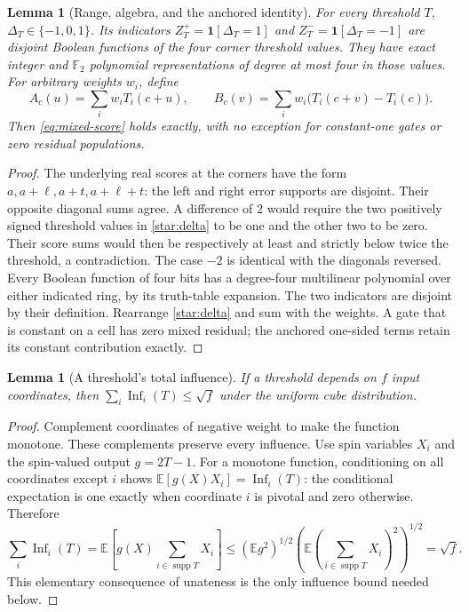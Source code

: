 \documentclass[11pt,letterpaper]{article}
\newtheorem{lemma}[theorem]{Lemma}
\theoremstyle{definition}
\theoremstyle{remark}
\newcommand{\E}{\mathbb E}
\newcommand{\F}{\mathbb F}
\newcommand{\ind}{\mathbf 1}
\newcommand{\supp}{\operatorname{supp}}
\newcommand{\Inf}{\operatorname{Inf}}
\begin{document}
\begin{lemma}[Range, algebra, and the anchored identity]
\label{star:range}
For every threshold $T$, $\Delta_T\in\{-1,0,1\}$.
Its indicators $Z_T^+=\ind[\Delta_T=1]$ and
$Z_T^-=\ind[\Delta_T=-1]$ are disjoint Boolean functions of the four
corner threshold values. They have exact integer and $\F_2$ polynomial
representations of degree at most four in those values.
For arbitrary weights $w_i$, define
\[
A_c(u)=\sum_iw_iT_i(c+u),\qquad
B_c(v)=\sum_iw_i\bigl(T_i(c+v)-T_i(c)\bigr).
\]
Then \cref{eq:mixed-score} holds exactly, with no exception for
constant-one gates or zero residual populations.
\end{lemma}
\begin{proof}
The underlying real scores at the corners have the form
$a,a+\ell,a+t,a+\ell+t$: the left and right error supports are
disjoint. Their opposite diagonal sums agree. A difference of $2$
would require the two positively signed threshold values in
\cref{star:delta} to be one and the other two to be zero. Their score
sums would then be respectively at least and strictly below twice the
threshold, a contradiction. The case $-2$ is identical with the
diagonals reversed. Every Boolean function of four bits has a degree-four
multilinear polynomial over either indicated ring, by its truth-table
expansion. The two indicators are disjoint by their definition.
Rearrange \cref{star:delta} and sum with the weights. A gate that is
constant on a cell has zero mixed residual; the anchored one-sided
terms retain its constant contribution exactly.
\end{proof}

\begin{lemma}[A threshold's total influence]
\label{star:influence}
If a threshold depends on $f$ input coordinates, then
$\sum_i\Inf_i(T)\le\sqrt f$ under the uniform cube distribution.
\end{lemma}
\begin{proof}
Complement coordinates of negative weight to make the function monotone.
These complements preserve every influence. Use spin variables $X_i$
and the spin-valued output $g=2T-1$. For a monotone function,
conditioning on all coordinates except $i$ shows
$\E[g(X)X_i]=\Inf_i(T)$: the conditional expectation is one exactly
when coordinate $i$ is pivotal and zero otherwise. Therefore
\[
\sum_i\Inf_i(T)=\E\!\left[g(X)\sum_{i\in\supp T}X_i\right]
\le (\E g^2)^{1/2}
     \left(\E\left(\sum_{i\in\supp T}X_i\right)^2\right)^{1/2}
=\sqrt f.
\]
This elementary consequence of unateness is the only influence bound
needed below.
\end{proof}
\end{document}

